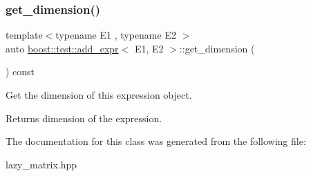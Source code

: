 \subsubsection{\texorpdfstring{get\_dimension()}{get\_dimension()}}
{\footnotesize\ttfamily template$<$typename E1 , typename E2 $>$ \\
auto \mbox{\hyperlink{classboost_1_1test_1_1add__expr}{boost\+::test\+::add\+\_\+expr}}$<$ E1, E2 $>$\+::get\+\_\+dimension (\begin{DoxyParamCaption}{ }\end{DoxyParamCaption}) const\hspace{0.3cm}{\ttfamily [inline]}}



Get the dimension of this expression object. 

\begin{DoxyReturn}{Returns}
dimension of the expression. 
\end{DoxyReturn}


The documentation for this class was generated from the following file\+:\begin{DoxyCompactItemize}
\item 
lazy\+\_\+matrix.\+hpp\end{DoxyCompactItemize}
